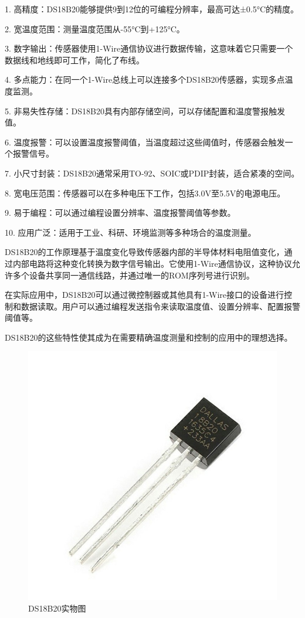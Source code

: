 \documentclass{textreportclass}  %
\begin{document}
	1. 高精度：DS18B20能够提供9到12位的可编程分辨率，最高可达±0.5°C的精度。
	
	2. 宽温度范围：测量温度范围从-55°C到+125°C。
	
	3. 数字输出：传感器使用1-Wire通信协议进行数据传输，这意味着它只需要一个数据线和地线即可工作，简化了布线。
	
	4. 多点能力：在同一个1-Wire总线上可以连接多个DS18B20传感器，实现多点温度监测。
	
	5. 非易失性存储：DS18B20具有内部存储空间，可以存储配置和温度警报触发值。
	
	6. 温度报警：可以设置温度报警阈值，当温度超过这些阈值时，传感器会触发一个报警信号。
	
	7. 小尺寸封装：DS18B20通常采用TO-92、SOIC或PDIP封装，适合紧凑的空间。
	
	8. 宽电压范围：传感器可以在多种电压下工作，包括3.0V至5.5V的电源电压。
	
	9. 易于编程：可以通过编程设置分辨率、温度报警阈值等参数。
	
	10. 应用广泛：适用于工业、科研、环境监测等多种场合的温度测量。
	
	DS18B20的工作原理基于温度变化导致传感器内部的半导体材料电阻值变化，通过内部电路将这种变化转换为数字信号输出。它使用1-Wire通信协议，这种协议允许多个设备共享同一通信线路，并通过唯一的ROM序列号进行识别。
	
	在实际应用中，DS18B20可以通过微控制器或其他具有1-Wire接口的设备进行控制和数据读取。用户可以通过编程发送指令来读取温度值、设置分辨率、配置报警阈值等。
	
	DS18B20的这些特性使其成为在需要精确温度测量和控制的应用中的理想选择。
	
	
	\begin{figure}[htbp]
		\centering
		\includegraphics[scale=0.1]{Fig/DS18B.jpg}
		\caption{DS18B20实物图}\label{Fig.30}
	\end{figure}
	
\end{document}

